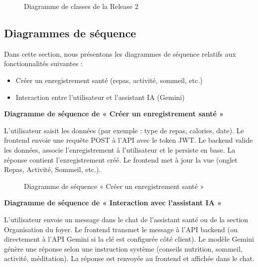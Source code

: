 \begin{figure}[H]
\centering
\caption{Diagramme de classes de la Release 2}
\label{authCUgen20}
\end{figure}

\subsection{Diagrammes de séquence}

Dans cette section, nous présentons les diagrammes de séquence relatifs aux fonctionnalités suivantes :
\begin{itemize}
\item Créer un enregistrement santé (repas, activité, sommeil, etc.)
\item Interaction entre l'utilisateur et l'assistant IA (Gemini)
\end{itemize}

\textbf{Diagramme de séquence de « Créer un enregistrement santé »}

L'utilisateur saisit les données (par exemple : type de repas, calories, date). Le frontend envoie une requête POST à l'API avec le token JWT. Le backend valide les données, associe l'enregistrement à l'utilisateur et le persiste en base. La réponse contient l'enregistrement créé. Le frontend met à jour la vue (onglet Repas, Activité, Sommeil, etc.).

\begin{figure}[H]
\centering
\caption{Diagramme de séquence « Créer un enregistrement santé »}
\label{inscSE16}
\end{figure}

\textbf{Diagramme de séquence de « Interaction avec l'assistant IA »}

L'utilisateur envoie un message dans le chat de l'assistant santé ou de la section Organisation du foyer. Le frontend transmet le message à l'API backend (ou directement à l'API Gemini si la clé est configurée côté client). Le modèle Gemini génère une réponse selon une instruction système (conseils nutrition, sommeil, activité, méditation). La réponse est renvoyée au frontend et affichée dans le chat.

